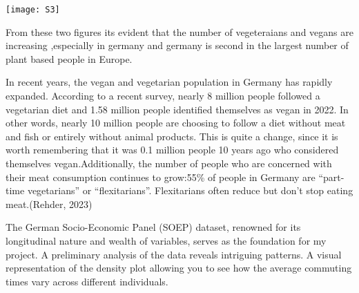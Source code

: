 \documentclass[
]{article}
\begin{document}
\texttt{[image: S3]}

From these two figures its evident that the number of vegeteraians and
vegans are increasing ,especially in germany and germany is second in
the largest number of plant based people in Europe.

In recent years, the vegan and vegetarian population in Germany has
rapidly expanded. According to a recent survey, nearly 8 million people
followed a vegetarian diet and 1.58 million people identified themselves
as vegan in 2022. In other words, nearly 10 million people are choosing
to follow a diet without meat and fish or entirely without animal
products. This is quite a change, since it is worth remembering that it
was 0.1 million people 10 years ago who considered themselves
vegan.Additionally, the number of people who are concerned with their
meat consumption continues to grow:55\% of people in Germany are
``part-time vegetarians'' or ``flexitarians''. Flexitarians often reduce
but don't stop eating meat.(Rehder, 2023)

The German Socio-Economic Panel (SOEP) dataset, renowned for its
longitudinal nature and wealth of variables, serves as the foundation
for my project. A preliminary analysis of the data reveals intriguing
patterns. A visual representation of the density plot allowing you to
see how the average commuting times vary across different individuals.
\end{document}
